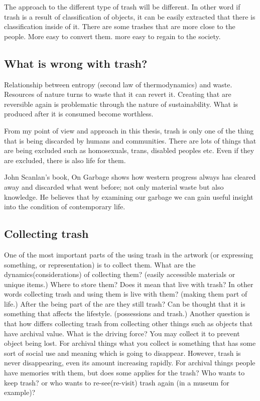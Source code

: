 The approach to the different type of trash will be different. In other word if trash is a result of classification of objects, it can be easily extracted that there is classification inside of it. There are some trashes that are more close to the people. More easy to convert them. more easy to regain to the society.  

\subsection{What is wrong with trash?}
Relationship between entropy (second law of thermodynamics) and waste. Resources of nature turns to waste that it can revert it. Creating that are reversible again is problematic through the nature of sustainability. What is produced after it is consumed become worthless. 

From my point of view and approach in this thesis, trash is only one of the thing that is being discarded by humans and communities. There are lots of things that are being excluded such as homosexuals, trans, disabled peoples etc. Even if they are excluded, there is also life for them. 

John Scanlan's book, On Garbage shows how western progress always has cleared away and discarded what went before; not only material waste but also knowledge. He believes that by examining our garbage we can gain useful insight into the condition of contemporary life.

\subsection{Collecting trash}
One of the most important parts of the using trash in the artwork (or expressing something, or representation) is to collect them. What are the dynamics(considerations) of collecting them? (easily accessible materials or unique items.) Where to store them? Does it mean that live with trash? In other words collecting trash and using them is live with them? (making them part of life.) After the being part of the are they still trash? Can be thought that it is something that affects the lifestyle. (possessions and trash.) Another question is that how differs collecting trash from collecting other things such as objects that have archival value. What is the driving force? You may collect it to prevent object being lost. For archival things what you collect is something that has some sort of social use and meaning which is going to disappear. However, trash is never disappearing, even its amount increasing rapidly. For archival things people have memories with them, but does some applies for the trash? Who wants to keep trash? or who wants to re-see(re-visit) trash again (in a museum for example)?

